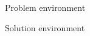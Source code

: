 \documentclass{homework}
\begin{document}
\maketitle

\begin{problem}[1]
    Problem environment
\end{problem}

\begin{solution}
    Solution environment
\end{solution}
\end{document}
